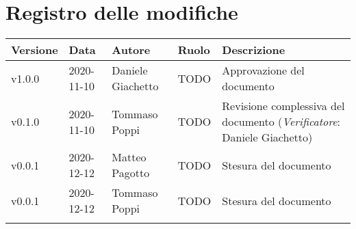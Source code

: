 \section*{\hfil Registro delle modifiche \hfil}
{
	\newlength{\freewidth}
	\setlength{\freewidth}{\dimexpr\textwidth-10\tabcolsep}
	\renewcommand{\arraystretch}{1.5}
	\centering
	\setlength{\aboverulesep}{0pt}
	\setlength{\belowrulesep}{0pt}
	\begin{longtable}{C{.131777\freewidth} C{.134036\freewidth} C{.263554\freewidth} C{.188254\freewidth} C{.282379\freewidth}}
		\toprule 
		\textbf{Versione} & \textbf{Data} & \textbf{Autore} & \textbf{Ruolo} & \textbf{Descrizione}\\
		\toprule
		\endhead
		
		v1.0.0 & 2020-11-10 & Daniele Giachetto & TODO & Approvazione del documento \\  
		v0.1.0 & 2020-11-10 & Tommaso Poppi & TODO & Revisione complessiva del documento (\textit{Verificatore}: Daniele Giachetto) \\
		v0.0.1 & 2020-12-12 & Matteo Pagotto & TODO & Stesura del documento \\
		v0.0.1 & 2020-12-12 & Tommaso Poppi & TODO & Stesura del documento \\
			
		\bottomrule
		\hiderowcolors
	\end{longtable}
}
